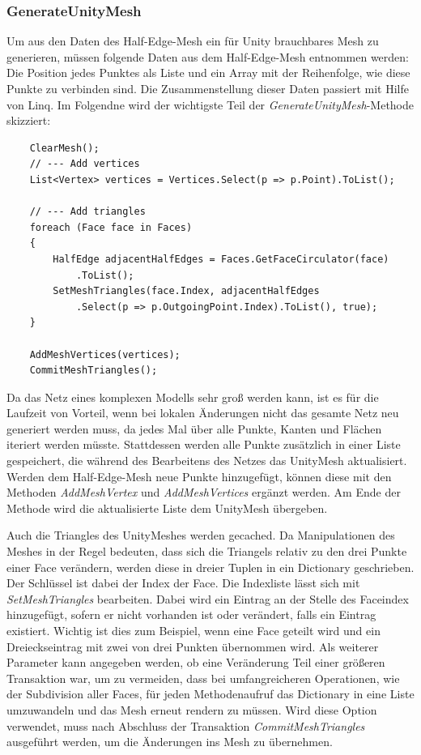 \subsubsection{GenerateUnityMesh}
Um aus den Daten des Half-Edge-Mesh ein f\"ur Unity brauchbares Mesh zu generieren, m\"ussen folgende Daten aus dem Half-Edge-Mesh entnommen werden: Die Position jedes Punktes als Liste und ein Array mit der Reihenfolge, wie diese Punkte zu verbinden sind. Die Zusammenstellung dieser Daten passiert mit Hilfe von Linq. Im Folgendne wird der wichtigste Teil der \textit{GenerateUnityMesh}-Methode skizziert:
\begin{lstlisting}
	ClearMesh();
	// --- Add vertices
	List<Vertex> vertices = Vertices.Select(p => p.Point).ToList();

	// --- Add triangles
	foreach (Face face in Faces)
	{
		HalfEdge adjacentHalfEdges = Faces.GetFaceCirculator(face)
			.ToList();
		SetMeshTriangles(face.Index, adjacentHalfEdges
			.Select(p => p.OutgoingPoint.Index).ToList(), true);
	}

	AddMeshVertices(vertices);
	CommitMeshTriangles();
\end{lstlisting}
Da das Netz eines komplexen Modells sehr gro{\ss} werden kann, ist es f\"ur die Laufzeit von Vorteil, wenn bei lokalen \"Anderungen nicht das gesamte Netz neu generiert werden muss, da jedes Mal \"uber alle Punkte, Kanten und Fl\"achen iteriert werden m\"usste. Stattdessen werden alle Punkte zus\"atzlich in einer Liste gespeichert, die w\"ahrend des Bearbeitens des Netzes das UnityMesh aktualisiert. Werden dem Half-Edge-Mesh neue Punkte hinzugef\"ugt, k\"onnen diese mit den Methoden \textit{AddMeshVertex} und \textit{AddMeshVertices} erg\"anzt werden. Am Ende der Methode wird die aktualisierte Liste dem UnityMesh \"ubergeben. 

Auch die Triangles des UnityMeshes werden gecached. Da Manipulationen des Meshes in der Regel bedeuten, dass sich die Triangels relativ zu den drei Punkte einer Face ver\"andern, werden diese in dreier Tuplen in ein Dictionary geschrieben. Der Schl\"ussel ist dabei der Index der Face. Die Indexliste l\"asst sich mit \textit{SetMeshTriangles} bearbeiten. Dabei wird ein Eintrag an der Stelle des Faceindex hinzugef\"ugt, sofern er nicht vorhanden ist oder ver\"andert, falls ein Eintrag existiert. Wichtig ist dies zum Beispiel, wenn eine Face geteilt wird und ein Dreieckseintrag mit zwei von drei Punkten \"ubernommen wird. Als weiterer Parameter kann angegeben werden, ob eine Ver\"anderung Teil einer gr\"o{\ss}eren Transaktion war, um zu vermeiden, dass bei umfangreicheren Operationen, wie der Subdivision aller Faces, f\"ur jeden Methodenaufruf das Dictionary in eine Liste umzuwandeln und das Mesh erneut rendern zu m\"ussen. Wird diese Option verwendet, muss nach Abschluss der Transaktion \textit{CommitMeshTriangles} ausgef\"uhrt werden, um die \"Anderungen ins Mesh zu \"ubernehmen.

